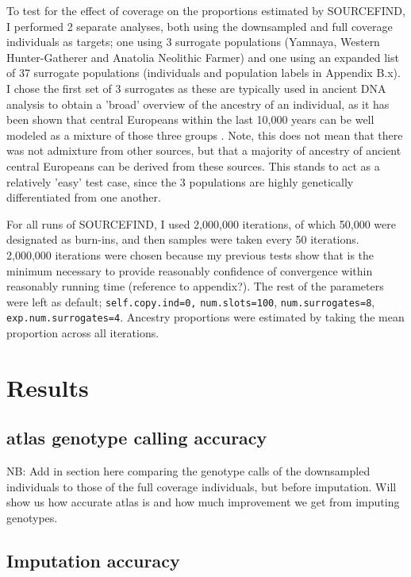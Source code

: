 To test for the effect of coverage on the proportions estimated by SOURCEFIND, I performed 2 separate analyses, both using the downsampled and full coverage individuals as targets; one using 3 surrogate populations (Yamnaya, Western Hunter-Gatherer and Anatolia Neolithic Farmer) and one using an expanded list of 37 surrogate populations (individuals and population labels in Appendix B.x). I chose the first set of 3 surrogates as these are typically used in ancient DNA analysis to obtain a 'broad' overview of the ancestry of an individual, as it has been shown that central Europeans within the last 10,000 years can be well modeled as a mixture of those three groups \cite{Lazaridis2014, Haak2015}. Note, this does not mean that there was not admixture from other sources, but that a majority of ancestry of ancient central Europeans can be derived from these sources. This stands to act as a relatively 'easy' test case, since the 3 populations are highly genetically differentiated from one another.

For all runs of SOURCEFIND, I used 2,000,000 iterations, of which 50,000 were designated as burn-ins, and then samples were taken every 50 iterations. 2,000,000 iterations were chosen because my previous tests show that is the minimum necessary to provide reasonably confidence of convergence within reasonably running time (reference to appendix?). The rest of the parameters were left as default; \texttt{self.copy.ind=0,} \texttt{num.slots=100}, \texttt{num.surrogates=8}, \texttt{exp.num.surrogates=4}. Ancestry proportions were estimated by taking the mean proportion across all iterations. 

\section{Results}

\subsection{atlas genotype calling accuracy}

NB: Add in section here comparing the genotype calls of the downsampled individuals to those of the full coverage individuals, but before imputation. Will show us how accurate atlas is and how much improvement we get from imputing genotypes.  

\subsection{Imputation accuracy}

